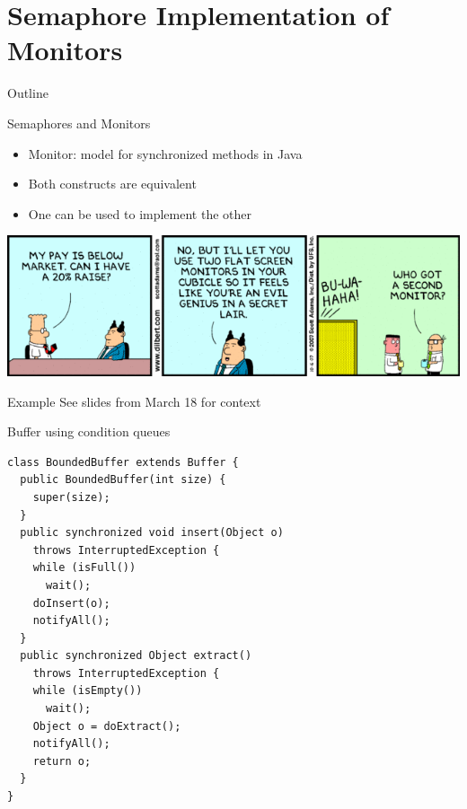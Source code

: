 \section{Semaphore Implementation of Monitors}

\begin{frame}{Outline}
  \tableofcontents[current]
\end{frame}

\begin{frame}{Semaphores and Monitors}
  \begin{itemize}
  \item Monitor: model for synchronized methods in Java
  \item Both constructs are equivalent
  \item One can be used to implement the other
  \end{itemize}

  
  \begin{center}
    \includegraphics[scale=0.4]{figures/dilbert-monitor}
  \end{center}
\end{frame}

\begin{frame}{Example}
  See slides from March 18 for context
\end{frame}

\begin{frame}[fragile]{Buffer using condition queues}
\begin{lstlisting}[basicstyle=\fontsize{9}{11}\selectfont\ttfamily]
class BoundedBuffer extends Buffer {
  public BoundedBuffer(int size) { 
    super(size);
  }
  public synchronized void insert(Object o) 
    throws InterruptedException {
    while (isFull())
      wait();
    doInsert(o);	
    notifyAll();
  }
  public synchronized Object extract() 
    throws InterruptedException {
    while (isEmpty())
      wait();
    Object o = doExtract();
    notifyAll();
    return o;
  }
}
\end{lstlisting}
\end{frame}

